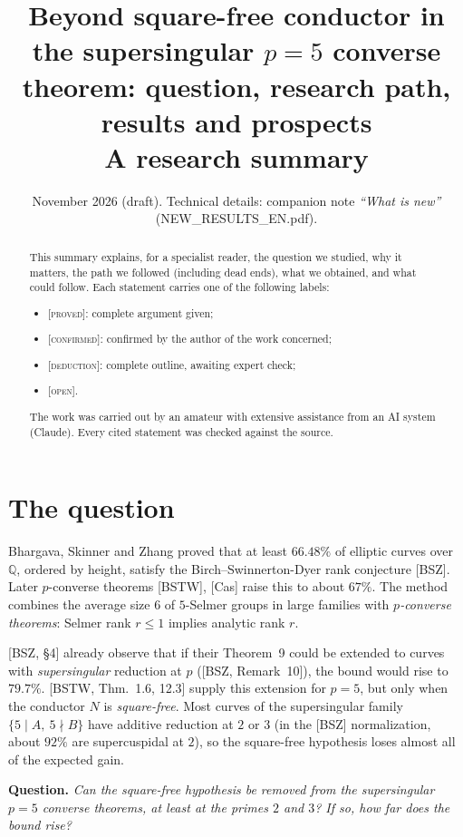 \documentclass[11pt]{amsart}
\title[Research summary]{Beyond square-free conductor in the supersingular $p=5$ converse theorem: question, research path, results and prospects\\[4pt]\normalfont\small A research summary}
\date{November 2026 (draft). Technical details: companion note \emph{``What is new''} (NEW\_RESULTS\_EN.pdf).}
\newcommand{\Q}{\mathbb{Q}}
\newcommand{\stat}[1]{\textsc{[#1]}}
\begin{document}
\begin{abstract}
This summary explains, for a specialist reader, the question we studied, why it matters, the path we followed (including dead ends), what we obtained, and what could follow. Each statement carries one of the following labels:
\begin{itemize}
\item \stat{proved}: complete argument given;
\item \stat{confirmed}: confirmed by the author of the work concerned;
\item \stat{deduction}: complete outline, awaiting expert check;
\item \stat{open}.
\end{itemize}
The work was carried out by an amateur with extensive assistance from an AI system (Claude). Every cited statement was checked against the source.
\end{abstract}
\maketitle

\section{The question}
Bhargava, Skinner and Zhang proved that at least $66.48\%$ of elliptic curves over $\Q$, ordered by height, satisfy the Birch--Swinnerton-Dyer rank conjecture [BSZ]. Later $p$-converse theorems [BSTW], [Cas] raise this to about $67\%$. The method combines the average size $6$ of $5$-Selmer groups in large families with \emph{$p$-converse theorems}: Selmer rank $r\le1$ implies analytic rank $r$.

[BSZ, \S4] already observe that if their Theorem~9 could be extended to curves with \emph{supersingular} reduction at $p$ ([BSZ, Remark~10]), the bound would rise to $79.7\%$. [BSTW, Thm.~1.6, 12.3] supply this extension for $p=5$, but only when the conductor $N$ is \emph{square-free}. Most curves of the supersingular family $\{5\mid A,\ 5\nmid B\}$ have additive reduction at $2$ or $3$ (in the [BSZ] normalization, about $92\%$ are supercuspidal at $2$), so the square-free hypothesis loses almost all of the expected gain.

\medskip\noindent\textbf{Question.} \emph{Can the square-free hypothesis be removed from the supersingular $p=5$ converse theorems, at least at the primes $2$ and $3$? If so, how far does the bound rise?}
\end{document}
